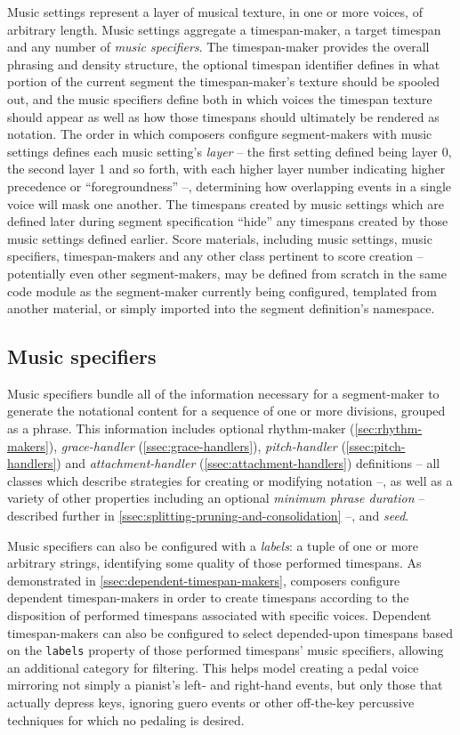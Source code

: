 Music settings represent a layer of musical texture, in one or more voices, of
arbitrary length. Music settings aggregate a timespan-maker, a target timespan
and any number of \emph{music specifiers}. The timespan-maker provides the
overall phrasing and density structure, the optional timespan identifier
defines in what portion of the current segment the timespan-maker's texture
should be spooled out, and the music specifiers define both in which voices the
timespan texture should appear as well as how those timespans should ultimately
be rendered as notation. The order in which composers configure segment-makers
with music settings defines each music setting's \emph{layer} -- the first
setting defined being layer 0, the second layer 1 and so forth, with each
higher layer number indicating higher precedence or \enquote{foregroundness}
--, determining how overlapping events in a single voice will mask one another.
The timespans created by music settings which are defined later during segment
specification \enquote{hide} any timespans created by those music settings
defined earlier. Score materials, including music settings, music specifiers,
timespan-makers and any other class pertinent to score creation -- potentially
even other segment-makers, may be defined from scratch in the same code module
as the segment-maker currently being configured, templated from another
material, or simply imported into the segment definition's namespace.

\subsection{Music specifiers}
\label{ssec:music-specifiers}

Music specifiers bundle all of the information necessary for a segment-maker to
generate the notational content for a sequence of one or more divisions,
grouped as a phrase. This information includes optional rhythm-maker
(\autoref{sec:rhythm-makers}), \emph{grace-handler}
(\autoref{ssec:grace-handlers}), \emph{pitch-handler}
(\autoref{ssec:pitch-handlers}) and \emph{attachment-handler}
(\autoref{ssec:attachment-handlers}) definitions -- all classes which describe
strategies for creating or modifying notation --, as well as a variety of other
properties including an optional \emph{minimum phrase duration} -- described
further in \autoref{ssec:splitting-pruning-and-consolidation} --, and
\emph{seed}.

Music specifiers can also be configured with a \emph{labels}: a tuple of one or
more arbitrary strings, identifying some quality of those performed timespans.
As demonstrated in \autoref{ssec:dependent-timespan-makers}, composers
configure dependent timespan-makers in order to create timespans according to
the disposition of performed timespans associated with specific voices.
Dependent timespan-makers can also be configured to select depended-upon
timespans based on the \texttt{labels} property of those performed timespans'
music specifiers, allowing an additional category for filtering. This helps
model creating a pedal voice mirroring not simply a pianist's
left- and right-hand events, but only those that actually depress keys,
ignoring guero events or other off-the-key percussive techniques for which no
pedaling is desired.

